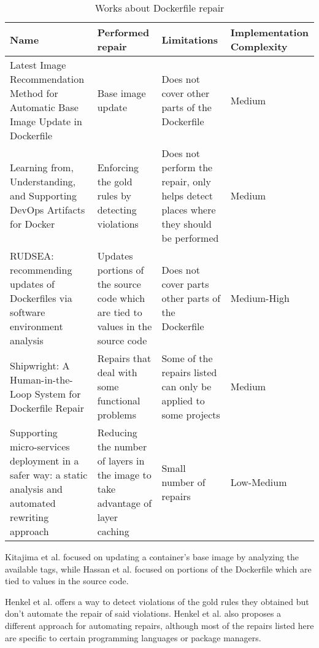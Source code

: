 \begin{table}[H]
    \centering
    \begin{tabular}{|p{}|p{}|p{}|p{}|}
        \hline \textbf{Name} & \textbf{Performed repair} & \textbf{Limitations} & \textbf{Implementation Complexity} \\
        \hline Latest Image Recommendation Method for Automatic Base Image Update in Dockerfile \cite{kitajimaLatestImageRecommendation2020} & Base image update & Does not cover other parts of the Dockerfile & Medium \\
        \hline Learning from, Understanding, and Supporting DevOps Artifacts for Docker \cite{henkelLearningUnderstandingSupporting2020} & Enforcing the gold rules by detecting violations & Does not perform the repair, only helps detect places where they should be performed & Medium \\
        \hline RUDSEA: recommending updates of Dockerfiles via software environment analysis \cite{hassanRUDSEARecommendingUpdates2018} & Updates portions of the source code which are tied to values in the source code & Does not cover parts other parts of the Dockerfile & Medium-High \\
        \hline Shipwright: A Human-in-the-Loop System for Dockerfile Repair \cite{henkelShipwrightHumanintheLoopSystem2021} & Repairs that deal with some functional problems & Some of the repairs listed can only be applied to some projects & Medium \\
        \hline Supporting micro-services deployment in a safer way: a static analysis and automated rewriting approach \cite{benniSupportingMicroservicesDeployment2018} & Reducing the number of layers in the image to take advantage of layer caching & Small number of repairs & Low-Medium \\
        \hline
    \end{tabular}
    \caption{Works about Dockerfile repair}
    \label{tab:works_dockerfile_repair}
\end{table}

Kitajima et al. \cite{kitajimaLatestImageRecommendation2020} focused on updating a container's base image by analyzing the available tags, while Hassan et al. \cite{hassanRUDSEARecommendingUpdates2018} focused on portions of the Dockerfile which are tied to values in the source code.

Henkel et al. \cite{henkelLearningUnderstandingSupporting2020} offers a way to detect violations of the gold rules they obtained but don't automate the repair of said violations. Henkel et al. \cite{henkelShipwrightHumanintheLoopSystem2021} also proposes a different approach for automating repairs, although most of the repairs listed here are specific to certain programming languages or package managers.

